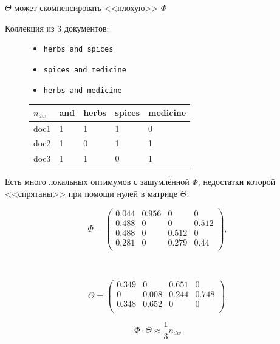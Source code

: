 \begin{frame}[t]{$\Theta$ может скомпенсировать <<плохую>> $\Phi$}

Коллекция из 3 документов: 
\begin{figure}[t]
\begin{minipage}[t]{0.4\textwidth}
	\medskip
\begin{itemize}
    \item \texttt{herbs and spices}
    \item \texttt{spices and medicine}
    \item \texttt{herbs and medicine}
\end{itemize}
	\end{minipage}
	\begin{minipage}[t]{0.4\textwidth}
\begin{center}
\begin{tabular}{l|llll}
$n_{dw}$   & and & herbs & spices & medicine \\ \hline
doc1       & 1   & 1     & 1      & 0        \\
doc2       & 1   & 0     & 1      & 1        \\
doc3       & 1   & 1     & 0      & 1      
\end{tabular}
\end{center}

\end{minipage}
\end{figure}

Есть много локальных оптимумов с зашумлённой $\Phi$, недостатки которой  <<спрятаны>>  при помощи нулей в матрице $\Theta$:
\small
\begin{minipage}[t]{0.4\textwidth}
\[
\Phi =
\begin{pmatrix}
    0.044 & 0.956 & 0 & 0 \\
    0.488 & 0 &  0 & 0.512 \\
    0.488 & 0 & 0.512 & 0   \\
    0.281 & 0 & 0.279 & 0.44 \\
\end{pmatrix},
\]
	\end{minipage}
	$\qquad\quad$
	\begin{minipage}[t]{0.4\textwidth}
\[
\Theta =
\begin{pmatrix}
    0.349 & 0 & 0.651 & 0 \\
    0 & 0.008 & 0.244 & 0.748 \\
    0.348 & 0.652 & 0 & 0 \\
\end{pmatrix}.
\]
\end{minipage}
\bigskip
\[
\Phi \cdot \Theta \approx \frac{1}{3} n_{dw}
\]
\normalsize
\end{frame}

